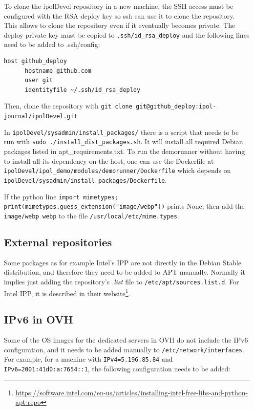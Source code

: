 \documentclass[a4paper,12pt]{article}
\begin{document}
To clone the ipolDevel repository in a new machine, the SSH access must be configured with the RSA deploy key so ssh can use it to clone the repository. This allows to clone the repository even if it eventually becomes private.
%
The deploy private key must be copied to {\tt .ssh/id\_rsa\_deploy} and the following lines need to be added to .ssh/config:

\begin{verbatim}
host github_deploy
      hostname github.com
      user git
      identityfile ~/.ssh/id_rsa_deploy
\end{verbatim}

Then, clone the repository with {\tt git clone git@github\_deploy:ipol-journal/ipolDevel.git}

In {\tt ipolDevel/sysadmin/install\_packages/} there is a script that needs to be run with {\tt sudo ./install\_dist\_packages.sh}. It will install all required Debian packages listed in apt\_requirements.txt.
To run the demorunner without having to install all its dependency on the host, one can use the Dockerfile at {\tt ipolDevel/ipol\_demo/modules/demorunner/Dockerfile} which depends on {\tt ipolDevel/sysadmin/install\_packages/Dockerfile}.

If the python line {\tt import mimetypes; print(mimetypes.guess\_extension("image/webp"))} prints None, then add the {\tt image/webp webp} to the file {\tt /usr/local/etc/mime.types}.

\subsection{External repositories}
Some packages as for example Intel's IPP are not directly in the Debian Stable distribution, and therefore they need to be added to APT manually. Normally it implies just adding the repository's \emph{.list} file to {\tt /etc/apt/sources.list.d}.
For Intel IPP, it is described in their website\footnote{\url{https://software.intel.com/en-us/articles/installing-intel-free-libs-and-python-apt-repo}}.

\subsection{IPv6 in OVH}
Some of the OS images for the dedicated servers in OVH do not include the IPv6 configuration, and it needs to be added manually to {\tt /etc/network/interfaces}.
For example, for a machine with {\tt IPv4=5.196.85.84} and {\tt IPv6=2001:41d0:a:7654::1}, the following configuration needs to be added:
\end{document}
